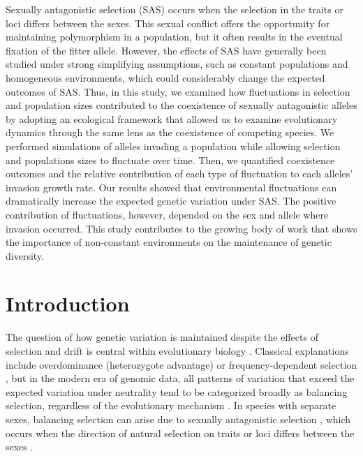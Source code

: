\documentclass[12pt]{article}
\begin{document}
Sexually antagonistic selection (SAS) occurs when the selection in the traits or loci differs between the sexes. This sexual conflict offers the opportunity for maintaining polymorphism in a population, but it often results in the eventual fixation of the fitter allele. However, the effects of SAS have generally been studied under strong simplifying assumptions, such as constant populations and homogeneous environments, which could considerably change the expected outcomes of SAS. Thus, in this study, we examined how fluctuations in selection and population sizes contributed to the coexistence of sexually antagonistic alleles by adopting an ecological framework that allowed us to examine evolutionary dynamics through the same lens as the coexistence of competing species. We performed simulations of alleles invading a population while allowing selection and populations sizes to fluctuate over time.  Then, we quantified coexistence outcomes and the relative contribution of each type of fluctuation to each alleles' invasion growth rate. Our results showed that environmental fluctuations can dramatically increase the expected genetic variation under SAS. The positive contribution of fluctuations, however, depended on the sex and allele where invasion occurred. This study contributes to the growing body of work that shows the importance of non-constant environments on the maintenance of genetic diversity.

\section{Introduction}
The question of how genetic variation is maintained despite the effects of selection and drift is central within evolutionary biology \citep{walsh_evolution_2018}. Classical explanations include overdominance (heterozygote advantage) or frequency-dependent selection \citep{hedrick2007balancing}, but in the modern era of genomic data, all patterns of variation that exceed the expected variation under neutrality tend to be categorized broadly as balancing selection, regardless of the evolutionary mechanism \citep{mitchell-olds_which_2007}. In species with separate sexes, balancing selection can arise due to sexually antagonistic selection \citep{connallon2014balancing}, which occurs when the direction of natural selection on traits or loci differs between the sexes \citep{lande1980sexual,arnqvist2013sexual}.
\end{document}
